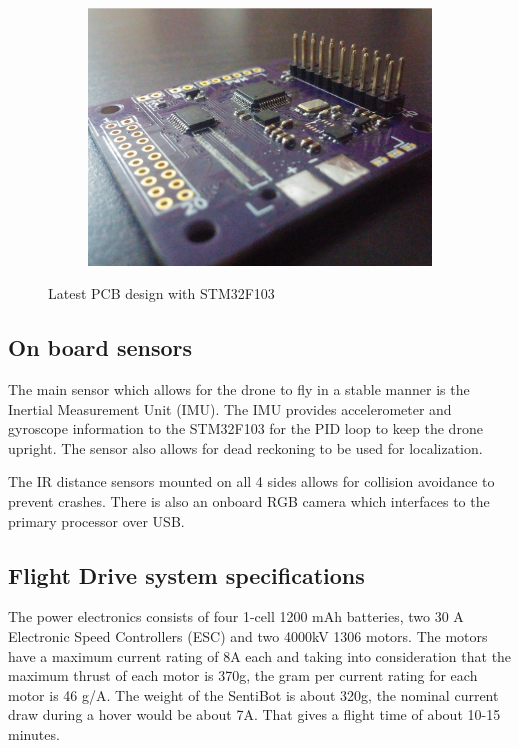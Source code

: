 \documentclass[12pt]{article}
\begin{document}
\begin{figure}[h]
	\centering
	\begin{subfigure}{0.65\textwidth}
		\centering
		\includegraphics[width=0.65\linewidth]{PCB.png}
	\end{subfigure}
	\caption{Latest PCB design with STM32F103}
	\label{fig:ocb}
\end{figure}


\subsection{On board sensors}

The main sensor which allows for the drone to fly in a stable manner is the Inertial Measurement Unit (IMU). The IMU provides accelerometer and gyroscope information to the STM32F103 for the PID loop to keep the drone upright. The sensor also allows for dead reckoning to be used for localization\cite{ultrasonic}.

The IR distance sensors mounted on all 4 sides allows for collision avoidance to prevent crashes. There is also an onboard RGB camera which interfaces to the primary processor over USB.

\subsection{Flight Drive system specifications}

The power electronics consists of four 1-cell 1200 mAh batteries, two 30 A Electronic Speed Controllers (ESC) and two 4000kV 1306 motors. The motors have a maximum current rating of 8A each and taking into consideration that the maximum thrust of each motor is 370g, the gram per current rating for each motor is 46 g/A. The weight of the SentiBot is about 320g, the nominal current draw during a hover would be about 7A. That gives a flight time of about 10-15 minutes. 
\end{document}
